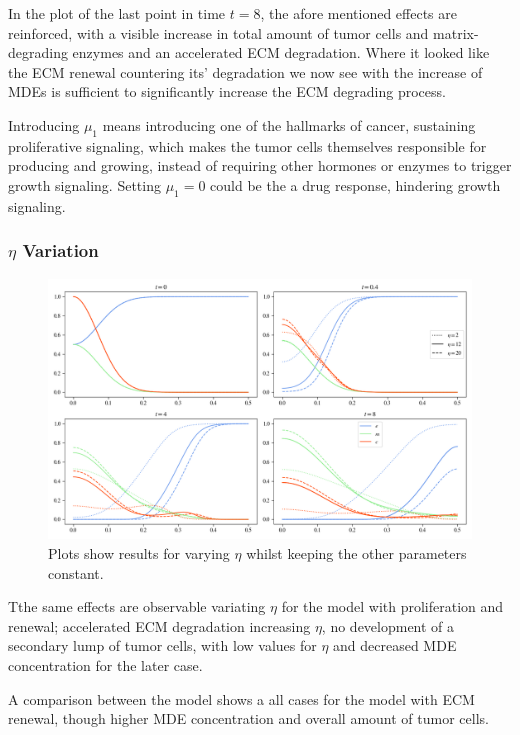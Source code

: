 In the plot of the last point in time $t=8$, the afore mentioned effects are reinforced, with a visible increase in total amount of tumor cells and matrix-degrading enzymes and an accelerated ECM degradation. Where it looked like the ECM renewal countering its' degradation we now see with the increase of MDEs is sufficient to significantly increase the ECM degrading process.

Introducing $\mu_1$ means introducing one of the hallmarks of cancer, sustaining proliferative signaling, which makes the tumor cells themselves responsible for producing and growing, instead of requiring other hormones or enzymes to trigger growth signaling. Setting $\mu_1=0$ could be the a drug response, hindering growth signaling.

\subsubsection*{$\eta$ Variation}
\begin{figure}[h!]
    \centering
    \includegraphics[width=\textwidth]{resources/images/prolif_eta_variation.png}
    \caption{Plots show results for varying $\eta$ whilst keeping the other parameters constant.}
    \label{fig:prolif_eta_variation}
\end{figure}

Tthe same effects are observable variating $\eta$ for the model with proliferation and renewal; accelerated ECM degradation increasing $\eta$, no development of a secondary lump of tumor cells, with low values for $\eta$ and decreased MDE concentration for the later case. 

A comparison between the model shows a all cases for the model with ECM renewal, though higher MDE concentration and overall amount of tumor cells.

